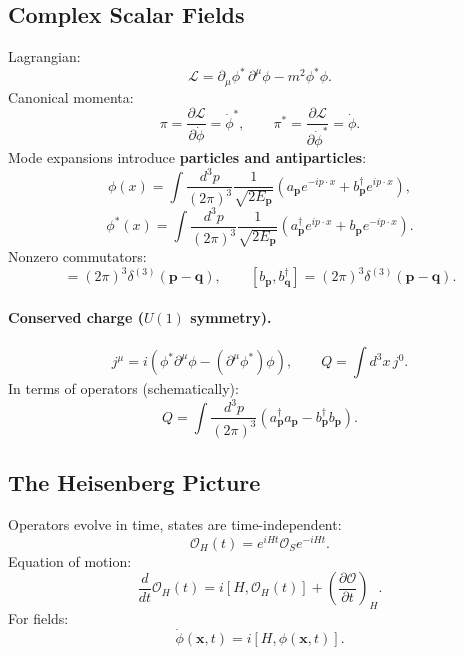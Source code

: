 \subsection{Complex Scalar Fields}
Lagrangian:
\begin{equation}
\mathcal{L}=\partial_\mu\phi^\ast\,\partial^\mu\phi - m^2\phi^\ast\phi.
\end{equation}
Canonical momenta:
\begin{equation}
\pi=\frac{\partial\mathcal{L}}{\partial\dot{\phi}}=\dot{\phi}^\ast,
\qquad
\pi^\ast=\frac{\partial\mathcal{L}}{\partial\dot{\phi}^\ast}=\dot{\phi}.
\end{equation}
Mode expansions introduce \textbf{particles and antiparticles}:
\begin{equation}
\phi(x)=\int\frac{d^3p}{(2\pi)^3}\frac{1}{\sqrt{2E_{\mathbf{p}}}}
\left(
a_{\mathbf{p}}e^{-ip\cdot x}+b^\dagger_{\mathbf{p}}e^{ip\cdot x}
\right),
\end{equation}
\begin{equation}
\phi^\ast(x)=\int\frac{d^3p}{(2\pi)^3}\frac{1}{\sqrt{2E_{\mathbf{p}}}}
\left(
a^\dagger_{\mathbf{p}}e^{ip\cdot x}+b_{\mathbf{p}}e^{-ip\cdot x}
\right).
\end{equation}
Nonzero commutators:
\begin{equation}
[a_{\mathbf{p}},a^\dagger_{\mathbf{q}}]=(2\pi)^3\delta^{(3)}(\mathbf{p}-\mathbf{q}),
\qquad
[b_{\mathbf{p}},b^\dagger_{\mathbf{q}}]=(2\pi)^3\delta^{(3)}(\mathbf{p}-\mathbf{q}).
\end{equation}

\paragraph{Conserved charge ($U(1)$ symmetry).}
\begin{equation}
j^\mu=i\left(\phi^\ast\partial^\mu\phi-(\partial^\mu\phi^\ast)\phi\right),
\qquad
Q=\int d^3x\,j^0.
\end{equation}
In terms of operators (schematically):
\begin{equation}
Q=\int\frac{d^3p}{(2\pi)^3}\left(a^\dagger_{\mathbf{p}}a_{\mathbf{p}}-b^\dagger_{\mathbf{p}}b_{\mathbf{p}}\right).
\end{equation}

\subsection{The Heisenberg Picture}
Operators evolve in time, states are time-independent:
\begin{equation}
\mathcal{O}_H(t)=e^{iHt}\mathcal{O}_S e^{-iHt}.
\end{equation}
Equation of motion:
\begin{equation}
\frac{d}{dt}\mathcal{O}_H(t)=i[H,\mathcal{O}_H(t)]+\left(\frac{\partial \mathcal{O}}{\partial t}\right)_H.
\end{equation}
For fields:
\begin{equation}
\dot{\phi}(\mathbf{x},t)=i[H,\phi(\mathbf{x},t)].
\end{equation}

